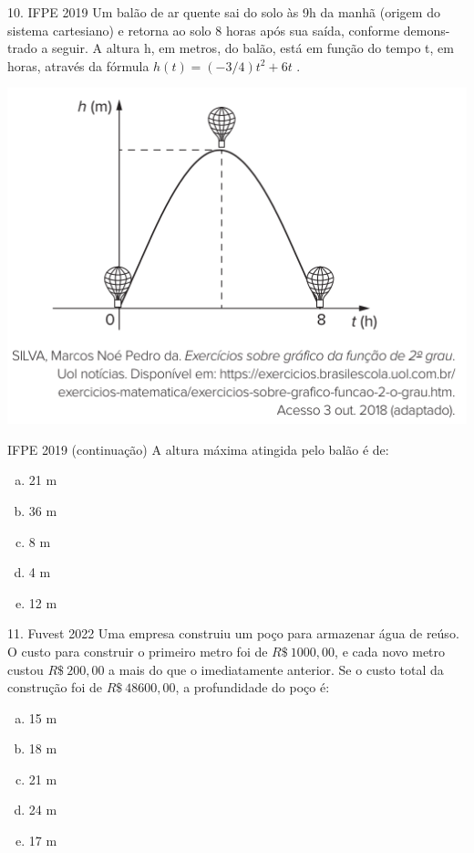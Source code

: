 \documentclass[11pt]{beamer}
\begin{document}
\begin{frame}{10. IFPE 2019}
    Um balão de ar quente sai do solo às 9h da manhã (origem do sistema cartesiano) e retorna ao solo 8 horas após sua saída, conforme demons- trado a seguir. A altura h, em metros, do balão, está em função do tempo t, em horas, através da fórmula $h(t)=(-{3}/{4})t^{2}+6t$ .

    \begin{center}
        \includegraphics[scale=0.5]{imagens/IFPE 2019.png}
    \end{center}
\end{frame}

\begin{frame}{IFPE 2019 (continuação)}
    A altura máxima atingida pelo balão é de:

    \begin{enumerate}[a)]
        \item 21 m %
        \item 36 m
        \item 8 m 
        \item 4 m
        \item 12 m
    \end{enumerate}
\end{frame}

\begin{frame}{11. Fuvest 2022}
    Uma empresa construiu um poço para armazenar água de reúso. O custo para construir o primeiro metro foi de $R\$\ 1 000,00$, e cada novo metro custou $R\$\ 200,00$ a mais do que o imediatamente anterior. Se o custo total da construção foi de $R\$\ 48 600,00$, a profundidade do poço é:

    \begin{enumerate}[a)]
        \item 15 m
        \item 18 m %
        \item 21 m
        \item 24 m
        \item 17 m
    \end{enumerate}
\end{frame}
\end{document}
